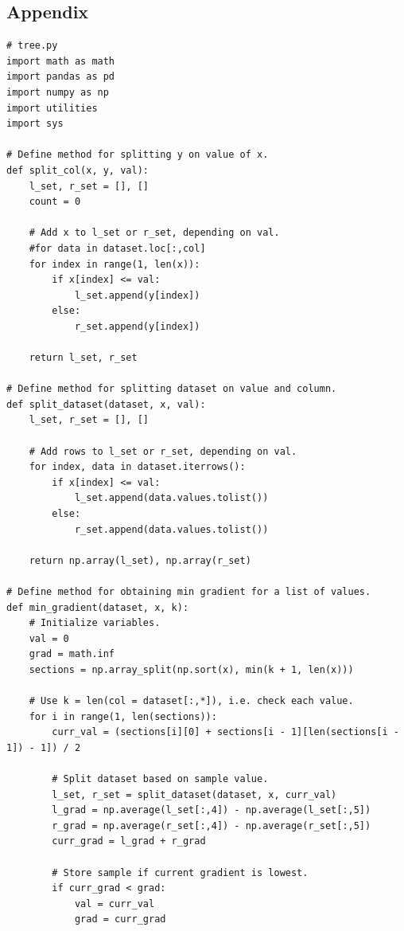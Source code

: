 \documentclass[letterpaper]{article} %
\begin{document}
\onecolumn

\pagebreak

\begin{center}
\section*{Appendix}
\label{app:b}
\end{center}

\bigskip

\footnotesize{
\begin{verbatim}
# tree.py
import math as math
import pandas as pd
import numpy as np
import utilities
import sys

# Define method for splitting y on value of x.
def split_col(x, y, val):
    l_set, r_set = [], []
    count = 0
    
    # Add x to l_set or r_set, depending on val.
    #for data in dataset.loc[:,col]
    for index in range(1, len(x)):
        if x[index] <= val:
            l_set.append(y[index])
        else:
            r_set.append(y[index])

    return l_set, r_set

# Define method for splitting dataset on value and column.
def split_dataset(dataset, x, val):
    l_set, r_set = [], []
    
    # Add rows to l_set or r_set, depending on val.
    for index, data in dataset.iterrows():
        if x[index] <= val:
            l_set.append(data.values.tolist())
        else:
            r_set.append(data.values.tolist())

    return np.array(l_set), np.array(r_set)

# Define method for obtaining min gradient for a list of values.
def min_gradient(dataset, x, k):
    # Initialize variables.
    val = 0
    grad = math.inf
    sections = np.array_split(np.sort(x), min(k + 1, len(x)))

    # Use k = len(col = dataset[:,*]), i.e. check each value.
    for i in range(1, len(sections)):
        curr_val = (sections[i][0] + sections[i - 1][len(sections[i - 1]) - 1]) / 2

        # Split dataset based on sample value.
        l_set, r_set = split_dataset(dataset, x, curr_val)
        l_grad = np.average(l_set[:,4]) - np.average(l_set[:,5])
        r_grad = np.average(r_set[:,4]) - np.average(r_set[:,5])
        curr_grad = l_grad + r_grad

        # Store sample if current gradient is lowest.
        if curr_grad < grad:
            val = curr_val
            grad = curr_grad


\end{verbatim}}
\end{document}
